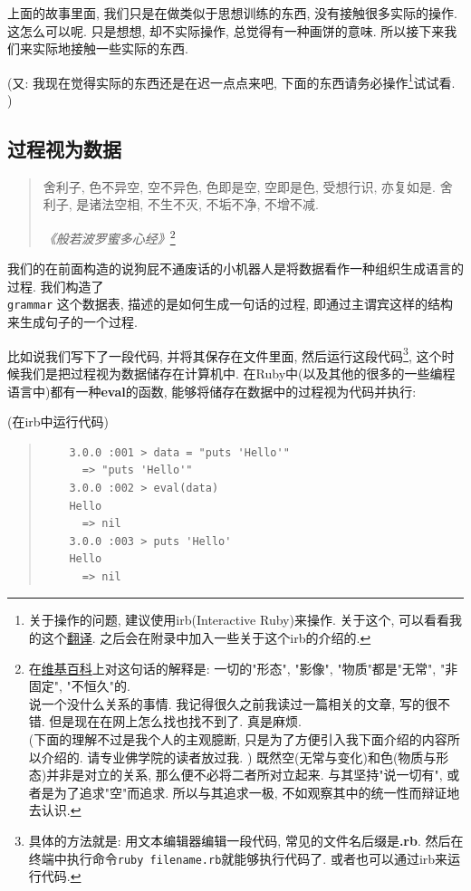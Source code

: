 上面的故事里面, 我们只是在做类似于思想训练的东西, 没有接触很多实际的操作. 这怎么可以呢. 只是想想, 却不实际操作, 总觉得有一种画饼的意味. 所以接下来我们来实际地接触一些实际的东西. 

(又: 我现在觉得实际的东西还是在迟一点点来吧, 下面的东西请务必操作\footnote{关于操作的问题, 建议使用irb(Interactive Ruby)来操作. 关于这个, 可以看看我的这个\href{https://li-yiyang.github.io/ruby/why's_(poignant)_guide_to_ruby/why's-poignant-guide/}{翻译}. 之后会在附录中加入一些关于这个irb的介绍的. }试试看. )

\subsection{过程视为数据}
\begin{quotation}
  舍利子, 色不异空, 空不异色, 色即是空, 空即是色, 受想行识, 亦复如是. 舍利子, 是诸法空相, 不生不灭, 不垢不净, 不增不减. 

  \emph{《般若波罗蜜多心经》}\footnote{在\href{https://zh.wikipedia.org/wiki/般若波羅蜜多心經}{维基百科}上对这句话的解释是: 一切的"形态", "影像", "物质"都是"无常", "非固定", "不恒久"的. \\说一个没什么关系的事情. 我记得很久之前我读过一篇相关的文章, 写的很不错. 但是现在在网上怎么找也找不到了. 真是麻烦. \\(下面的理解不过是我个人的主观臆断, 只是为了方便引入我下面介绍的内容所以介绍的. 请专业佛学院的读者放过我. ) 既然空(无常与变化)和色(物质与形态)并非是对立的关系, 那么便不必将二者所对立起来. 与其坚持"说一切有", 或者是为了追求"空"而追求. 所以与其追求一极, 不如观察其中的统一性而辩证地去认识. }
\end{quotation}

我们的在前面构造的说狗屁不通废话的小机器人是将数据看作一种组织生成语言的过程. 我们构造了 \\\texttt{grammar} 这个数据表, 描述的是如何生成一句话的过程, 即通过主谓宾这样的结构来生成句子的一个过程. 

比如说我们写下了一段代码, 并将其保存在文件里面, 然后运行这段代码\footnote{具体的方法就是: 用文本编辑器编辑一段代码, 常见的文件名后缀是\textbf{.rb}. 然后在终端中执行命令\texttt{ruby filename.rb}就能够执行代码了. 或者也可以通过irb来运行代码. }, 这个时候我们是把过程视为数据储存在计算机中. 在Ruby中(以及其他的很多的一些编程语言中)都有一种\textbf{eval}的函数, 能够将储存在数据中的过程视为代码并执行: 

(在irb中运行代码)

\begin{quotation}
  \begin{verbatim}
    3.0.0 :001 > data = "puts 'Hello'"
      => "puts 'Hello'" 
    3.0.0 :002 > eval(data)
    Hello
      => nil 
    3.0.0 :003 > puts 'Hello'
    Hello
      => nil 
  \end{verbatim}
\end{quotation}

